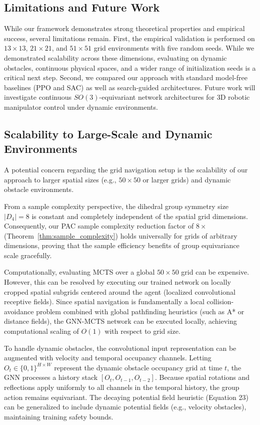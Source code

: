 \documentclass{article}
\begin{document}
\subsection{Limitations and Future Work}
While our framework demonstrates strong theoretical properties and empirical success, several limitations remain. First, the empirical validation is performed on $13 \times 13$, $21 \times 21$, and $51 \times 51$ grid environments with five random seeds. While we demonstrated scalability across these dimensions, evaluating on dynamic obstacles, continuous physical spaces, and a wider range of initialization seeds is a critical next step. Second, we compared our approach with standard model-free baselines (PPO and SAC) as well as search-guided architectures. Future work will investigate continuous $SO(3)$-equivariant network architectures for 3D robotic manipulator control under dynamic environments.

\subsection{Scalability to Large-Scale and Dynamic Environments}
A potential concern regarding the grid navigation setup is the scalability of our approach to larger spatial sizes (e.g., $50 \times 50$ or larger grids) and dynamic obstacle environments. 

From a sample complexity perspective, the dihedral group symmetry size $|D_4| = 8$ is constant and completely independent of the spatial grid dimensions. Consequently, our PAC sample complexity reduction factor of $8\times$ (Theorem~\ref{thm:sample_complexity}) holds universally for grids of arbitrary dimensions, proving that the sample efficiency benefits of group equivariance scale gracefully.

Computationally, evaluating MCTS over a global $50 \times 50$ grid can be expensive. However, this can be resolved by executing our trained network on locally cropped spatial subgrids centered around the agent (localized convolutional receptive fields). Since spatial navigation is fundamentally a local collision-avoidance problem combined with global pathfinding heuristics (such as A* or distance fields), the GNN-MCTS network can be executed locally, achieving computational scaling of $O(1)$ with respect to grid size. 

To handle dynamic obstacles, the convolutional input representation can be augmented with velocity and temporal occupancy channels. Letting $O_t \in \{0, 1\}^{H \times W}$ represent the dynamic obstacle occupancy grid at time $t$, the GNN processes a history stack $[O_t, O_{t-1}, O_{t-2}]$. Because spatial rotations and reflections apply uniformly to all channels in the temporal history, the group action remains equivariant. The decaying potential field heuristic (Equation 23) can be generalized to include dynamic potential fields (e.g., velocity obstacles), maintaining training safety bounds.
\end{document}
